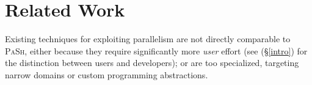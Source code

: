 \documentclass[sigplan, review, screen, anonymous]{acmart}
\newcommand{\heading}[1]{\vspace{4pt}\noindent\textbf{#1}\enspace}
\newcommand{\ttt}[1]{\texttt{#1}}
\newcommand{\kk}[1]{[{\color{magenta}kk: #1}]}
\newcommand{\sx}[1]{(\S\ref{#1})}
\newcommand{\sys}{{\scshape PaSh}\xspace}
\begin{document}
  

\section{Related Work}
\label{related}

Existing techniques for exploiting parallelism are not directly comparable to \sys, either because they require significantly more \emph{user} effort (see \sx{intro} for the distinction between users and developers); or are too specialized, targeting narrow domains or custom programming abstractions.
\end{document}

